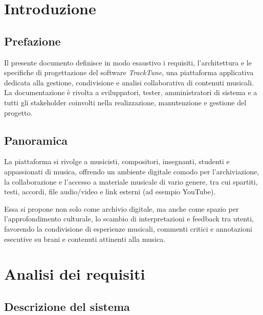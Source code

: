 \documentclass[a4paper]{article}
\begin{document}


\tableofcontents
\pagebreak

\section{Introduzione}

\subsection{Prefazione}

Il presente documento definisce in modo esaustivo i requisiti, l'architettura e 
le specifiche di progettazione del software \textit{TrackTune}, 
una piattaforma applicativa dedicata alla gestione, condivisione e analisi 
collaborativa di contenuti musicali.\\[2ex] 

La documentazione è rivolta a sviluppatori, tester, amministratori di sistema e a 
tutti gli stakeholder coinvolti nella realizzazione, manutenzione e gestione del 
progetto.

\subsection{Panoramica}

La piattaforma si rivolge a musicisti, compositori, insegnanti, studenti e appassionati
di musica, offrendo un ambiente digitale comodo per l’archiviazione, la collaborazione 
e l’accesso a materiale musicale di vario genere, tra cui spartiti, testi, accordi, 
file audio/video e link esterni (ad esempio YouTube).

Essa si propone non solo come archivio digitale, 
ma anche come spazio per l’approfondimento culturale, 
lo scambio di interpretazioni e feedback tra utenti, favorendo la condivisione 
di esperienze musicali, commenti critici e annotazioni esecutive su brani e 
contenuti attinenti alla musica.

\section{Analisi dei requisiti}

\subsection{Descrizione del sistema}
\end{document}
